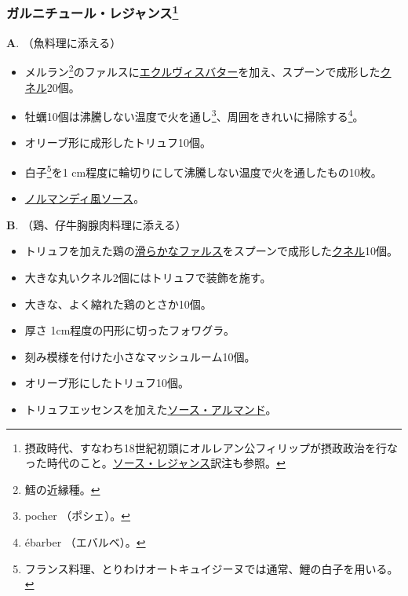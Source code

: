 \begin{recette}
\atoaki{}

\hypertarget{garniture-regence}{%
\subsubsection[ガルニチュール・レジャンス]{\texorpdfstring{ガルニチュール・レジャンス\footnote{摂政時代、すなわち18世紀初頭にオルレアン公フィリップが摂政政治を行なった時代のこと。\protect\hyperlink{sauce-regence}{ソース・レジャンス}訳注も参照。}}{ガルニチュール・レジャンス}}\label{garniture-regence}}



\textbf{A}. （魚料理に添える）

\begin{itemize}
\item
  メルラン\footnote{鱈の近縁種。}のファルスに\protect\hyperlink{beurre-d-ecrevisse}{エクルヴィスバター}を加え、スプーンで成形した\protect\hyperlink{quenelles}{クネル}20個。
\item
  牡蠣10個は沸騰しない温度で火を通し\footnote{pocher （ポシェ）。}、周囲をきれいに掃除する\footnote{ébarber
    （エバルベ）。}。
\item
  オリーブ形に成形したトリュフ10個。
\item
  白子\footnote{フランス料理、とりわけオートキュイジーヌでは通常、鯉の白子を用いる。}を1
  cm程度に輪切りにして沸騰しない温度で火を通したもの10枚。
\item
  \protect\hyperlink{sauce-normande}{ノルマンディ風ソース}。
\end{itemize}

\textbf{B}. （鶏、仔牛胸腺肉料理に添える）

\begin{itemize}
\item
  トリュフを加えた鶏の\protect\hyperlink{farce-b}{滑らかなファルス}をスプーンで成形した\protect\hyperlink{quenelles}{クネル}10個。
\item
  大きな丸いクネル2個にはトリュフで装飾を施す。
\item
  大きな、よく縮れた鶏のとさか10個。
\item
  厚さ 1cm程度の円形に切ったフォワグラ。
\item
  刻み模様を付けた小さなマッシュルーム10個。
\item
  オリーブ形にしたトリュフ10個。
\item
  トリュフエッセンスを加えた\protect\hyperlink{sauce-allemande}{ソース・アルマンド}。
\end{itemize}


\end{recette}
